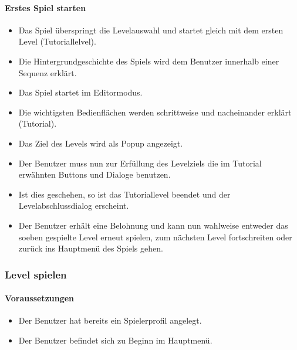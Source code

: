 \paragraph{Erstes Spiel starten}
\begin{itemize}
	\item Das Spiel überspringt die Levelauswahl und startet gleich mit dem ersten Level (Tutoriallelvel).
	\item Die Hintergrundgeschichte des Spiels wird dem Benutzer innerhalb einer Sequenz erklärt.
	\item Das Spiel startet im Editormodus.
	\item Die wichtigsten Bedienflächen werden schrittweise und nacheinander erklärt (Tutorial).
	\item Das Ziel des Levels wird als Popup angezeigt.
	\item Der Benutzer muss nun zur Erfüllung des Levelziels die im Tutorial erwähnten Buttons und Dialoge benutzen.
	\item Ist dies geschehen, so ist das Tutoriallevel beendet und der Levelabschlussdialog erscheint.
	\item Der Benutzer erhält eine Belohnung und kann nun wahlweise entweder das soeben gespielte Level erneut spielen, zum nächsten Level fortschreiten oder zurück ins Hauptmenü des Spiels gehen.
\end{itemize}

\subsubsection{Level spielen}
\paragraph{Voraussetzungen}
\begin{itemize}
	\item Der Benutzer hat bereits ein Spielerprofil angelegt.
	\item Der Benutzer befindet sich zu Beginn im Hauptmenü.
\end{itemize}
